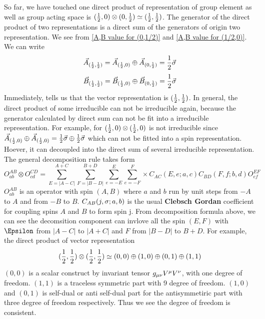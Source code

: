 So far, we have touched one direct product of representation of group element as well as group acting space is 
$(\frac{1}{2},0) \otimes (0,\frac{1}{2}) \simeq (\frac{1}{2},\frac{1}{2})$. The generator of the direct product of two representations is a direct sum of the generators of origin two representation. We see from \eqref{A,B value for (0,1/2)} and \eqref{A,B value for (1/2,0)}. We can write
\begin{equation}
    \vec{A}_{(\frac{1}{2},\frac{1}{2})} 
    = \vec{A}_{(\frac{1}{2},0)} \oplus \vec{A}_{(0,\frac{1}{2})}
    = \frac{1}{2}{\vec{\sigma}}
\end{equation} 
\begin{equation}
    \vec{B}_{(\frac{1}{2},\frac{1}{2})} 
  = \vec{B}_{(\frac{1}{2},0)} \oplus \vec{B}_{(0,\frac{1}{2})}
  = \frac{1}{2}{\vec{\sigma}}
\end{equation}
Immediately, tells us that the vector representation is $(\frac{1}{2},\frac{1}{2})$.
In general, the direct product of some irreducible can not be irreducible again, because the generator calculated by direct sum can not be fit into a irreducible representation. For example, for $(\frac{1}{2},0)\otimes(\frac{1}{2},0)$
is not irreducible since 
$\vec{A}_{(\frac{1}{2},0)} \oplus \vec{A}_{(\frac{1}{2},0)}
= \frac{1}{2}{\vec{\sigma}} \oplus \frac{1}{2}\vec{\sigma}$ which can not be fitted into a spin representation. 
Hoever, it can decoupled into the direct sum of several irreducible representation. The general decomposition rule takes form 
\begin{equation}
  O^{AB}_{ab} \otimes O^{CD}_{cd}
  =\sum_{E=|A-C|}^{A+C}
   \sum_{F=|B-D|}^{B+D}
   \sum_{e=-E}^{E}
   \sum_{e=-F}^{F}
   \times
   C_{AC}(E,e;a,c)
   C_{BD}(F,f;b,d)
   O^{EF}_{ef}
\end{equation}
 $O^{AB}_{ab}$ is an operator with spin $(A,B)$ where $a$ and $b$ run by unit steps from $-A$ to $A$ and from $-B$ to $B$. $C_{AB}(j,\sigma;a,b)$ is the usual \textbf{Clebsch Gordan} coefficient for coupling spins $A$ and $B$ to form spin j. From decomposition formula above, we can see the decomsition component can invlove all the spin $(E,F)$ with $\E$ from $|A-C|$ to $|A+C|$ and $F$ from $|B-D|$ to $B+D$. 
 For example, the direct product of vector representation 
 \begin{equation}
 (\frac{1}{2},\frac{1}{2})\otimes(\frac{1}{2},\frac{1}{2}) \simeq (0,0)\oplus(1,0)\oplus(0,1)\oplus(1,1)
 \end{equation} 
 $(0,0)$ is a scalar construct by invariant tensor $g_{\mu\nu}V^{\mu}V^{\nu}$, with one degree of freedom.
 $(1,1)$ is a traceless symmetric part with 9 degree of freedom.
 $(1,0)$ and $(0,1)$ is self-dual or anti self-dual part for the antisymmetiric part with three degree of freedom respectively. Thus we see the degree of freedom is consistent.
 
